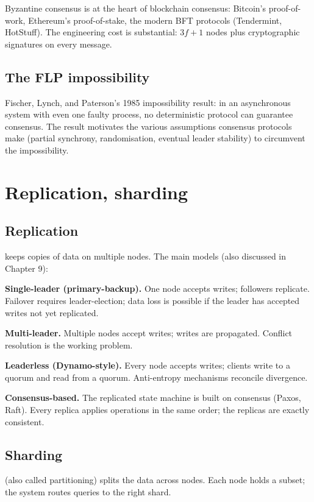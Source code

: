 Byzantine consensus is at the heart of blockchain consensus: Bitcoin's proof-of-work, Ethereum's proof-of-stake, the modern BFT protocols (Tendermint, HotStuff). The engineering cost is substantial: $3f + 1$ nodes plus cryptographic signatures on every message.

\subsection{The FLP impossibility}

Fischer, Lynch, and Paterson's 1985 impossibility result: in an asynchronous system with even one faulty process, no deterministic protocol can guarantee consensus. The result motivates the various assumptions consensus protocols make (partial synchrony, randomisation, eventual leader stability) to circumvent the impossibility.

\section{Replication, sharding}

\subsection{Replication}

 keeps copies of data on multiple nodes. The main models (also discussed in Chapter 9):

\textbf{Single-leader (primary-backup).} One node accepts writes; followers replicate. Failover requires leader-election; data loss is possible if the leader has accepted writes not yet replicated.

\textbf{Multi-leader.} Multiple nodes accept writes; writes are propagated. Conflict resolution is the working problem.

\textbf{Leaderless (Dynamo-style).} Every node accepts writes; clients write to a quorum and read from a quorum. Anti-entropy mechanisms reconcile divergence.

\textbf{Consensus-based.} The replicated state machine is built on consensus (Paxos, Raft). Every replica applies operations in the same order; the replicas are exactly consistent.

\subsection{Sharding}

 (also called partitioning) splits the data across nodes. Each node holds a subset; the system routes queries to the right shard.

